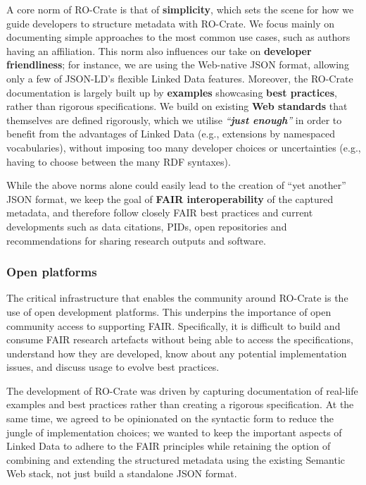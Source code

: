 \documentclass[ds,v1.1.2,openaccess]{iosart2x}%
\begin{document}
A core norm of RO-Crate is that of \textbf{simplicity}, which sets the scene
for how we guide developers to structure metadata with RO-Crate. We
focus mainly on documenting simple approaches to the most common use
cases, such as authors having an affiliation. This norm also influences
our take on \textbf{developer friendliness}; for instance, we are using the
Web-native JSON format, allowing only a few of JSON-LD's flexible
Linked Data features. Moreover, the RO-Crate documentation is largely
built up by \textbf{examples} showcasing \textbf{best practices}, rather than
rigorous specifications. We build on existing \textbf{Web standards} that
themselves are defined rigorously, which we utilise \textit{``\textbf{just
enough}''} in order to benefit from the advantages of Linked Data
(e.g., extensions by namespaced vocabularies), without imposing too
many developer choices or uncertainties (e.g., having to choose between
the many RDF syntaxes).

While the above norms alone could easily lead to the creation of ``yet
another'' JSON format, we keep the goal of \textbf{FAIR interoperability} of
the captured metadata, and therefore follow closely FAIR best practices
and current developments such as data citations, PIDs, open
repositories and recommendations for sharing research outputs and software.

\subsubsection{Open platforms}

The critical infrastructure that enables the community around RO-Crate
is the use of open development platforms. This underpins the importance
of open community access to supporting FAIR. Specifically, it is
difficult to build and consume FAIR research artefacts without being
able to access the specifications, understand how they are developed,
know about any potential implementation issues, and discuss usage to
evolve best practices.

The development of RO-Crate was driven by capturing documentation of
real-life examples and best practices rather than creating a rigorous
specification. At the same time, we agreed to be opinionated on the
syntactic form to reduce the jungle of implementation choices; we
wanted to keep the important aspects of Linked Data to adhere to the
FAIR principles while retaining the option of combining and extending
the structured metadata using the existing Semantic Web stack, not just
build a standalone JSON format.
\end{document}
